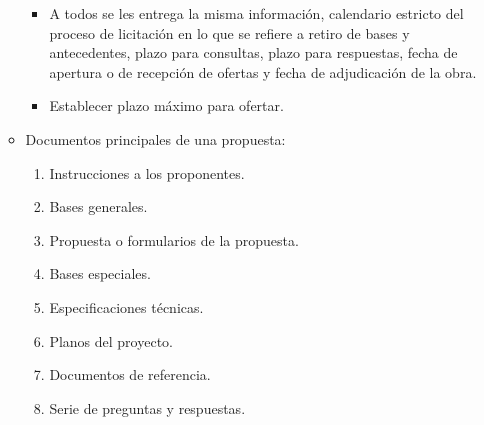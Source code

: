 \documentclass{article} %
\begin{document}
\begin{itemize}[label={},left=0pt,align=parleft]
\begin{itemize}[label={},left=1em,align=parleft]
\begin{itemize}[label={},left=2em,align=parleft]
            \item \begin{highlightbox}[levelthree] A todos se les entrega la misma información, calendario estricto del proceso de licitación en lo que se refiere a retiro de bases y antecedentes, plazo para consultas, plazo para respuestas, fecha de apertura o de recepción de ofertas y fecha de adjudicación de la obra. \end{highlightbox}
            \item \begin{highlightbox}[levelthree] Establecer plazo máximo para ofertar. \end{highlightbox}
        \end{itemize}
        \item \begin{highlightbox}[leveltwo] Documentos principales de una propuesta: \end{highlightbox}
        \begin{enumerate}
            \item \begin{highlightbox}[levelfour] Instrucciones a los proponentes. \end{highlightbox}
            \item \begin{highlightbox}[levelfour] Bases generales. \end{highlightbox}
            \item \begin{highlightbox}[levelfour] Propuesta o formularios de la propuesta. \end{highlightbox}
            \item \begin{highlightbox}[levelfour] Bases especiales. \end{highlightbox}
            \item \begin{highlightbox}[levelfour] Especificaciones técnicas. \end{highlightbox}
            \item \begin{highlightbox}[levelfour] Planos del proyecto. \end{highlightbox}
            \item \begin{highlightbox}[levelfour] Documentos de referencia. \end{highlightbox}
            \item \begin{highlightbox}[levelfour] Serie de preguntas y respuestas. \end{highlightbox}

\end{enumerate}
\end{itemize}
\end{itemize}
\end{document}
